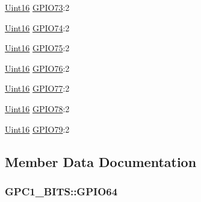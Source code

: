 \begin{DoxyCompactItemize}
\item 
\hyperlink{_d_s_p2833x___device_8h_a59a9f6be4562c327cbfb4f7e8e18f08b}{Uint16} \hyperlink{struct_g_p_c1___b_i_t_s_aee48b5aeea2ad32fa81c487fa87662e2}{G\+P\+I\+O73}\+:2
\item 
\hyperlink{_d_s_p2833x___device_8h_a59a9f6be4562c327cbfb4f7e8e18f08b}{Uint16} \hyperlink{struct_g_p_c1___b_i_t_s_abed9e0496908845e3eac61b24f23b336}{G\+P\+I\+O74}\+:2
\item 
\hyperlink{_d_s_p2833x___device_8h_a59a9f6be4562c327cbfb4f7e8e18f08b}{Uint16} \hyperlink{struct_g_p_c1___b_i_t_s_af6339ad4d7800f1024220ce50bc67326}{G\+P\+I\+O75}\+:2
\item 
\hyperlink{_d_s_p2833x___device_8h_a59a9f6be4562c327cbfb4f7e8e18f08b}{Uint16} \hyperlink{struct_g_p_c1___b_i_t_s_a9061fdfa155cac8a0dfe0b2145528a63}{G\+P\+I\+O76}\+:2
\item 
\hyperlink{_d_s_p2833x___device_8h_a59a9f6be4562c327cbfb4f7e8e18f08b}{Uint16} \hyperlink{struct_g_p_c1___b_i_t_s_a4066ca864828d9e25485dee909ad450f}{G\+P\+I\+O77}\+:2
\item 
\hyperlink{_d_s_p2833x___device_8h_a59a9f6be4562c327cbfb4f7e8e18f08b}{Uint16} \hyperlink{struct_g_p_c1___b_i_t_s_ad92d75291f8f9451fb33b31bdb80e97d}{G\+P\+I\+O78}\+:2
\item 
\hyperlink{_d_s_p2833x___device_8h_a59a9f6be4562c327cbfb4f7e8e18f08b}{Uint16} \hyperlink{struct_g_p_c1___b_i_t_s_af55d6bbd3208945e61e2ba2ee58eb81b}{G\+P\+I\+O79}\+:2
\end{DoxyCompactItemize}


\subsection{Member Data Documentation}
\hypertarget{struct_g_p_c1___b_i_t_s_a59ec77f5991c65977b0b5e053f5f9f0c}{}
\subsubsection[{G\+P\+I\+O64}]{ G\+P\+C1\+\_\+\+B\+I\+T\+S\+::\+G\+P\+I\+O64}\label{struct_g_p_c1___b_i_t_s_a59ec77f5991c65977b0b5e053f5f9f0c}
\hypertarget{struct_g_p_c1___b_i_t_s_a554aa3494dd57a80bb103153000b1584}{}
